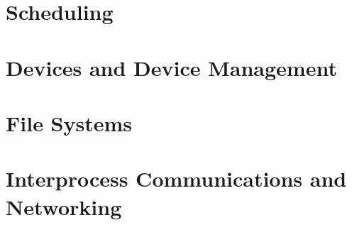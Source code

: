\documentclass[12pt]{article}
\theoremstyle{plain}
\theoremstyle{definition}
\begin{document}
\newpage
\section{Scheduling}

\newpage
\section{Devices and Device Management}

\newpage
\section{File Systems}

\newpage
\section{Interprocess Communications and Networking}

\clearpage
\printindex
\end{document}
